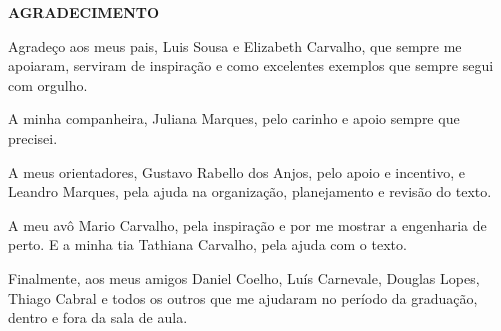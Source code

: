 \begin{center}
\textbf{AGRADECIMENTO}
\end{center}

Agradeço aos meus pais, Luis Sousa e Elizabeth Carvalho, que sempre me apoiaram, serviram de inspiração e como excelentes exemplos que sempre segui com orgulho.

A minha companheira, Juliana Marques, pelo carinho e apoio sempre que precisei.

A meus orientadores, Gustavo Rabello dos Anjos, pelo apoio e incentivo, e Leandro Marques, pela ajuda na organização, planejamento e revisão do texto.

A meu avô Mario Carvalho, pela inspiração e por me mostrar a engenharia de perto. E a minha tia Tathiana Carvalho, pela ajuda com o texto.

Finalmente, aos meus amigos Daniel Coelho, Luís Carnevale, Douglas Lopes, Thiago Cabral e todos os outros que me ajudaram no período da graduação, dentro e fora da sala de aula.